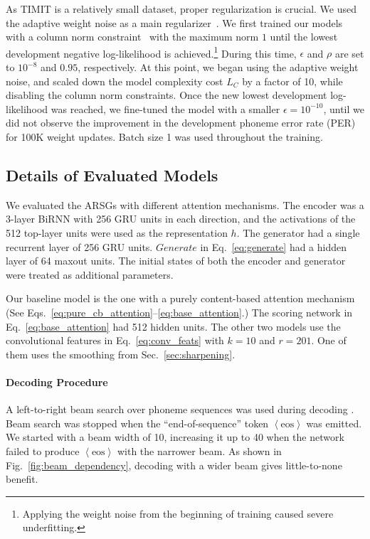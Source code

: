 \documentclass{article}
\begin{document}
As TIMIT is a relatively small dataset, proper regularization is crucial. We used
the adaptive weight noise as a main regularizer~\cite{graves_2011}.  We first
trained our models with a column norm constraint~\cite{hinton_2012} with the
maximum norm $1$
until the lowest development negative log-likelihood is achieved.\footnote{
    Applying the weight noise from the beginning of training caused severe
    underfitting.
}
During this time, $\epsilon$ and $\rho$ are set to $10^{-8}$ and $0.95$,
respectively.  At this point, we began using the adaptive weight noise, and
scaled down the model complexity cost $L_C$ by a factor of 10, while disabling
the column norm constraints. Once
the new lowest development log-likelihood was reached, we fine-tuned the model
with a smaller $\epsilon=10^{-10}$, until we did
not observe the improvement in the development phoneme error rate (PER) for 100K
weight updates. Batch size 1 was used throughout the
training.







\subsection{Details of Evaluated Models}
\label{sec:evaluate}

We evaluated the ARSGs with different attention mechanisms.  The encoder was a
3-layer BiRNN with 256 GRU units in each direction, and the activations of the
512 top-layer units were used as the representation $h$.  The generator had a
single recurrent layer of 256 GRU units. 
$Generate$ in Eq.~\eqref{eq:generate} had a hidden layer of 64 maxout units.
The initial states of both the encoder and generator were treated as additional
parameters.







Our baseline model is the one with a purely content-based attention mechanism
(See Eqs.~\eqref{eq:pure_cb_attention}--\eqref{eq:base_attention}.) The scoring
network in Eq.~\eqref{eq:base_attention} had 512 
hidden units.
The other two models use the convolutional features in Eq.~\eqref{eq:conv_feats}
with $k=10$ and $r=201$. One of them uses the smoothing from
Sec.~\ref{sec:sharpening}.

\paragraph{Decoding Procedure}
A left-to-right beam search over phoneme sequences
was used during decoding \cite{sutskever_sequence_2014}. Beam search was stopped
when the ``end-of-sequence'' token $\left<\text{eos}\right>$ was emitted. We
started with a beam width of 10, increasing it up to 40 when the network failed
to produce $\left<\text{eos}\right>$ with the narrower beam.  As shown in
Fig.~\ref{fig:beam_dependency}, decoding with a wider beam gives little-to-none
benefit. 
\end{document}
